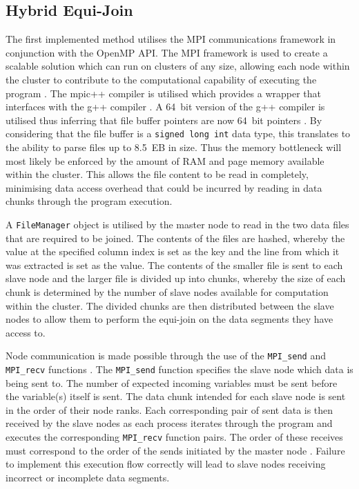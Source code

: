 \documentclass[10pt,twocolumn]{witseiepaper}
\begin{document}
\subsection{Hybrid Equi-Join}
The first implemented method utilises the MPI communications framework in conjunction with the OpenMP API. The MPI framework is used to create a scalable solution which can run on clusters of any size, allowing each node within the cluster to contribute to the computational capability of executing the program \cite{mpi-scale}. The mpic++ compiler is utilised which provides a wrapper that interfaces with the g++ compiler \cite{mpic++-wrapper}. A 64~bit version of the g++ compiler is utilised thus inferring that file buffer pointers are now 64~bit pointers \cite{pointer-size}. By considering that the file buffer is a \texttt{signed long int} data type, this translates to the ability to parse files up to 8.5~EB in size. Thus the memory bottleneck will most likely be enforced by the amount of RAM and page memory available within the cluster. This allows the file content to be read in completely, minimising data access overhead that could be incurred by reading in data chunks through the program execution.

A \texttt{FileManager} object is utilised by the master node to read in the two data files that are required to be joined. The contents of the files are hashed, whereby the value at the specified column index is set as the key and the line from which it was extracted is set as the value. The contents of the smaller file is sent to each slave node and the larger file is divided up into chunks, whereby the size of each chunk is determined by the number of slave nodes available for computation within the cluster. The divided chunks are then distributed between the slave nodes to allow them to perform the equi-join on the data segments they have access to.

Node communication is made possible through the use of the \texttt{MPI\_send} and \texttt{MPI\_recv} functions \cite{mpi-send}. The \texttt{MPI\_send} function specifies the slave node which data is being sent to. The number of expected incoming variables must be sent before the variable(s) itself is sent. The data chunk intended for each slave node is sent in the order of their node ranks. Each corresponding pair of sent data is then received by the slave nodes as each process iterates through the program and executes the corresponding \texttt{MPI\_recv} function pairs. The order of these receives must correspond to the order of the sends initiated by the master node \cite{mpi-send}. Failure to implement this execution flow correctly will lead to slave nodes receiving incorrect or incomplete data segments.
\end{document}
